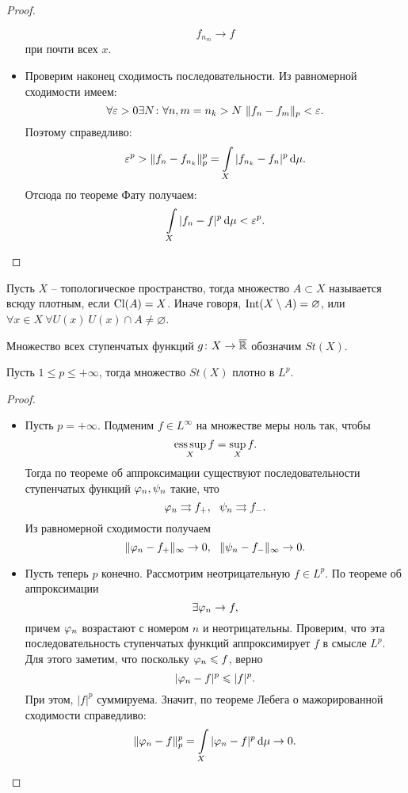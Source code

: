 \begin{proof}
\begin{itemize}
            \[
                f_{n_m} \to f
            \]
            при почти всех $x$.
        \item Проверим наконец сходимость последовательности. Из равномерной 
            сходимости имеем:
            \[
                \forall \varepsilon > 0 \exists N \colon \forall n, m = n_k > N~
                \lVert f_n - f_m\rVert_p < \varepsilon
            .\]
            Поэтому справедливо:
            \[
                \varepsilon^p > \lVert f_n - f_{n_k}\rVert^p_p = \int\limits_X{|f_{n_k} - f_n|^p \,\mathrm{d} \mu}
            .\]
            Отсюда по теореме Фату получаем:
            \[
                \int\limits_X{|f_n - f|^p \,\mathrm{d} \mu} < \varepsilon^p
            .\]
    \end{itemize}
\end{proof}

\begin{definition}
    Пусть $X$ -- топологическое пространство, тогда множество
    $A \subset X$ называется всюду плотным, если $\operatorname{Cl}(A) = X$.
    Иначе говоря, $\operatorname{Int}(X \setminus A) = \varnothing$, 
    или \\ $\forall x \in X~ \forall U(x)~ U(x) \cap A \neq \varnothing$.
\end{definition}

\begin{definition}
    Множество всех ступенчатых функций $g \colon X \to \overline{\mathbb{R}}$
    обозначим $St(X)$.
\end{definition}

\begin{lemma}
    Пусть $1 \leqslant p \leqslant +\infty$, тогда множество
    $St(X)$ плотно в $L^p$.
\end{lemma}
\begin{proof}
    \enewline
    \begin{itemize}
        \item Пусть $p = +\infty$. Подменим $f \in L^\infty$ на
            множестве меры ноль так, чтобы
            \[
                \operatorname*{ess\,sup}_X{f} = \sup_X{f}
            .\]
            Тогда по теореме об аппроксимации существуют последовательности 
            ступенчатых функций $\varphi_n, \psi_n$ такие, что
            \[
                \varphi_n \rightrightarrows f_+,~~ \psi_n \rightrightarrows f_-
            .\]
            Из равномерной сходимости получаем
            \[
                \lVert\varphi_n - f_+\rVert_\infty \to 0,~~ \lVert\psi_n - f_-\rVert_\infty \to 0
            .\]
        \item Пусть теперь $p$ конечно. Рассмотрим неотрицательную $f \in L^p$.
            По теореме об аппроксимации
            \[
                \exists \varphi_n \to f
            ,\]
            причем $\varphi_n$ возрастают с номером $n$ и неотрицательны. Проверим,
            что эта последовательность ступенчатых функций аппроксимирует
            $f$ в смысле $L^p$. Для этого заметим, что поскольку $\varphi_n \leqslant f$,
            верно
            \[
                |\varphi_n - f|^p \leqslant |f|^p
            .\]
            При этом, $|f|^p$ суммируема. Значит, по теореме Лебега о
            мажорированной сходимости справедливо:
            \[
                \lVert\varphi_n - f\rVert^p_p = \int\limits_X{|\varphi_n - f|^p \,\mathrm{d} \mu} \to 0
            .\]
    \end{itemize}
\end{proof}

